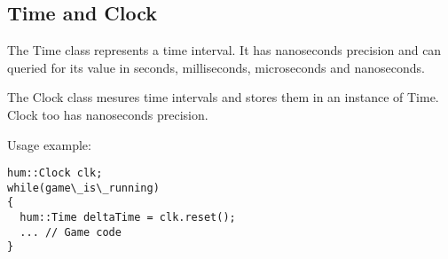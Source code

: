 \subsection{Time and Clock}

The Time class represents a time interval. It has nanoseconds precision and can 
queried for its value in seconds, milliseconds, microseconds and nanoseconds.

The Clock class mesures time intervals and stores them in an instance of Time. 
Clock too has nanoseconds precision.

Usage example:
\begin{lstlisting}[caption=Clock and Time example]
hum::Clock clk;
while(game\_is\_running)
{
  hum::Time deltaTime = clk.reset();
  ... // Game code
}
\end{lstlisting}
